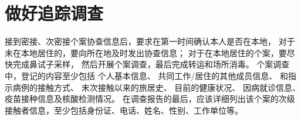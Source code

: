 \section{做好追踪调查}
接到密接、次密接个案协查信息后，要求在第一时间确认本人是否在本地，
对于未在本地居住的，要向所在地及时发出协查信息；
对于在本地居住的个案，要尽快完成鼻试子采样，
然后开展个案调查，最后完成转运和场所消毒。
个案调查中，登记的内容至少包括
个人基本信息、
共同工作/居住的其他成员信息、
和指示病例的接触方式、
末次接触以来的旅居史、
目前的健康状况、
因病就诊信息、
疫苗接种信息及核酸检测情况。
在调查报告的最后，应该详细列出该个案的次级接触者信息，至少包括身份证、电话、姓名、性别、工作单位等。
